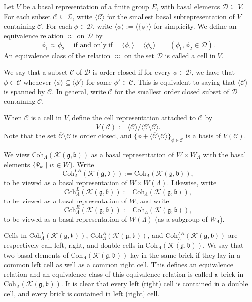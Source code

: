 \documentclass[12pt,a4paper]{amsart}
\def\subset{\subseteq}
\newcommand{\CB}{{\mathcal {B}}}
\newcommand{\CC}{{\mathcal {C}}}
\newcommand{\CK}{{\mathcal {K}}}
\newcommand{\g}{\mathfrak g}
\renewcommand{\b}{\mathfrak b}
\newcommand{\la}{\langle}
\newcommand{\ra}{\rangle}
\numberwithin{equation}{section}
\theoremstyle{remark}
\def\Coh{\mathrm{Coh}}
\begin{document}
Let $V$ be a basal representation of a finite group $E$, with basal elements
$\mathcal D\subset V$. For each subset $\mathcal C\subset \mathcal D$, write $\la \CC\ra$ for
the smallest basal subrepresentation of $V$ containing $\CC$. For each
$\phi\in \mathcal D$, write $\la \phi\ra:=\la \{\phi\}\ra$ for simplicity. We define an equivalence relation $\approx$ on $\mathcal D$  by
\[
  \phi_1 \approx \phi_2 \quad \textrm{ if and only if
  } \quad \la \phi_1 \ra =\la \phi_2 \ra \qquad (\phi_1, \phi_2\in \mathcal D).
\]
An equivalence class of the relation $\approx$ on the set $\mathcal D$ is called a cell in $V$.

We say that a subset $\CC$ of $\mathcal D$ is order closed if for every $\phi\in \mathcal D$, we have that $\phi\in \CC$ whenever $\la \phi\ra\subset \la \phi'\ra $ for some $\phi'\in \CC$.
This is equivalent to saying that $\la \CC\ra$ is spanned by $\CC$. In general, write $\overline \CC$ for the smallest order closed subset of $\mathcal D$ containing $\CC$.

When $\CC$ is a cell in $V$, define the cell representation attached to $\CC$ by
\[
  V(\CC):=\la \overline \CC \ra/ \la \overline \CC\setminus \CC\ra.
\]
Note that the set $ \overline \CC\setminus \CC$ is order closed, and $\{\phi+ \la \overline \CC\setminus \CC\ra\}_{ \phi\in \CC}$ is a basis of $V(\CC)$.


We view $\Coh_{\Lambda}( \CK(\g,\b))$ as a basal representation of $W\times W_\Lambda$ with the basal elements
 $\{\overline \Psi_{w}\mid w\in W\}$.
Write
\[
\Coh^{LR}_{\Lambda}( \CK(\g,\b)):=\Coh_{\Lambda}( \CK(\g,\b)),
\]
 to be viewed as a basal representation of $W\times W(\Lambda)$.
Likewise, write
\[
\Coh^{L}_{\Lambda}( \CK(\g,\b)):=\Coh_{\Lambda}( \CK(\g,\b)),
\]
 to be viewed as a basal representation of $W$, and write
 \[
 \Coh^{R}_{\Lambda}( \CK(\g,\b)):=\Coh_{\Lambda}( \CK(\g,\b)),
 \]
  to be viewed as a basal representation of $W(\Lambda)$ (as a subgroup of $W_\Lambda$).

Cells in $\Coh^{L}_{\Lambda}( \CK(\g,\b))$, $\Coh^{R}_{\Lambda}( \CK(\g,\b))$, and $\Coh^{LR}_{\Lambda}( \CK(\g,\b))$ are respectively call left, right, and double cells in  $\Coh_{\Lambda}( \CK(\g,\b))$. We say that two basal elements of $\Coh_{\Lambda}( \CK(\g,\b))$ lay in the same brick if they lay in a common left cell as well as a common right cell. This defines an equivalence relation and an equivalence class of this equivalence relation is called a brick in $\Coh_{\Lambda}( \CK(\g,\b))$.
It is clear that every left (right) cell is contained in a double cell, and every brick is contained in left  (right) cell.
\end{document}
